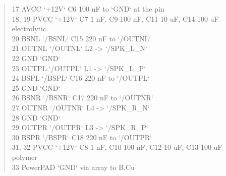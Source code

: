 \documentclass[11pt,a4paper]{article}
\begin{document}
\begin{quote}
\textbar{} 17 \textbar{} AVCC \textbar{} `+12V` \textbar{} C6 100 nF to `GND` at the pin \textbar{}\\
\textbar{} 18, 19 \textbar{} PVCC \textbar{} `+12V` \textbar{} C7 1 nF, C9 100 nF, C11 10 uF, C14 100 uF electrolytic \textbar{}\\
\textbar{} 20 \textbar{} BSNL \textbar{} `/BSNL` \textbar{} C15 220 nF to `/OUTNL` \textbar{}\\
\textbar{} 21 \textbar{} OUTNL \textbar{} `/OUTNL` \textbar{} L2 -\textgreater{} `/SPK\_L\_N` \textbar{}\\
\textbar{} 22 \textbar{} GND \textbar{} `GND` \textbar{} \textbar{}\\
\textbar{} 23 \textbar{} OUTPL \textbar{} `/OUTPL` \textbar{} L1 -\textgreater{} `/SPK\_L\_P` \textbar{}\\
\textbar{} 24 \textbar{} BSPL \textbar{} `/BSPL` \textbar{} C16 220 nF to `/OUTPL` \textbar{}\\
\textbar{} 25 \textbar{} GND \textbar{} `GND` \textbar{} \textbar{}\\
\textbar{} 26 \textbar{} BSNR \textbar{} `/BSNR` \textbar{} C17 220 nF to `/OUTNR` \textbar{}\\
\textbar{} 27 \textbar{} OUTNR \textbar{} `/OUTNR` \textbar{} L4 -\textgreater{} `/SPK\_R\_N` \textbar{}\\
\textbar{} 28 \textbar{} GND \textbar{} `GND` \textbar{} \textbar{}\\
\textbar{} 29 \textbar{} OUTPR \textbar{} `/OUTPR` \textbar{} L3 -\textgreater{} `/SPK\_R\_P` \textbar{}\\
\textbar{} 30 \textbar{} BSPR \textbar{} `/BSPR` \textbar{} C18 220 nF to `/OUTPR` \textbar{}\\
\textbar{} 31, 32 \textbar{} PVCC \textbar{} `+12V` \textbar{} C8 1 nF, C10 100 nF, C12 10 uF, C13 100 uF polymer \textbar{}\\
\textbar{} 33 \textbar{} PowerPAD \textbar{} `GND` \textbar{} via array to B.Cu \textbar{}
\end{quote}
\end{document}
